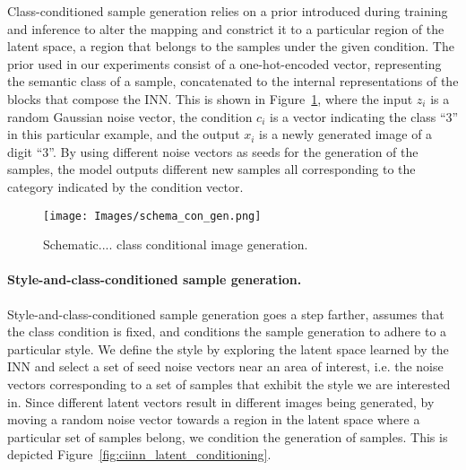             Class-conditioned sample generation relies on a prior introduced during training and inference to alter the mapping and constrict it to a particular region of the latent space, a region that belongs to the samples under the given condition. The prior used in our experiments consist of a one-hot-encoded vector, representing the semantic class of a sample, concatenated to the internal representations of the blocks that compose the INN. This is shown in Figure~\ref{fig:class_cond_gen},  where the input $z_i$ is a random Gaussian noise vector, the condition $c_i$ is a vector indicating the class ``3'' in this particular example, and the output $x_i$ is a newly generated image of a digit ``3''. By using different noise vectors as seeds for the generation of the samples, the model outputs different new samples all corresponding to the category indicated by the condition vector. 

            \begin{figure}
                \vskip -0.2in 
                \centering
    
                \texttt{[image: Images/schema\_con\_gen.png]} 
                
                \vspace{-2pt}
                \caption{\label{fig:class_cond_gen} Schematic.... class conditional image generation.}
                \vskip -0.0in 
            \end{figure}
        
            \paragraph{Style-and-class-conditioned sample generation.} 
            Style-and-class-conditioned sample generation goes a step farther, assumes that the class condition is fixed, and conditions the sample generation to adhere to a particular style. We define the style by exploring the latent space learned by the INN and select a set of seed noise vectors near an area of interest, i.e. the noise vectors corresponding to a set of samples that exhibit the style we are interested in. Since different latent vectors result in different images being generated, by moving a random noise vector towards a region in the latent space where a particular set of samples belong, we condition the generation of samples. This is depicted Figure~\ref{fig:ciinn_latent_conditioning}. 
            
